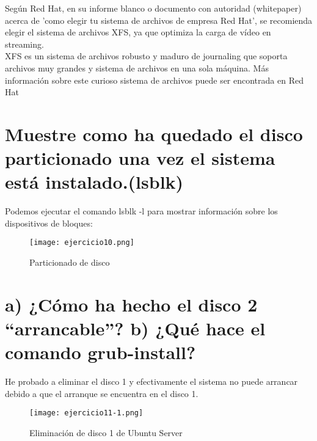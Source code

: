 	Según Red Hat, en su informe blanco o documento con autoridad\cite{treintaynueve} (whitepaper) acerca de 'como elegir tu sistema de archivos de empresa Red Hat', se recomienda elegir el sistema de archivos XFS, ya que optimiza la carga de vídeo en streaming.
	\\
	
	XFS es un sistema de archivos robusto y maduro de journaling que soporta archivos muy grandes y sistema de archivos en una sola máquina. Más información sobre este curioso sistema de archivos puede ser encontrada en Red Hat\cite{cuarenta}
	
	\section{Muestre como ha quedado el disco particionado una vez el sistema está instalado.(lsblk)}
	
	Podemos ejecutar el comando lsblk -l \cite{cuarentayuno} para mostrar información sobre los dispositivos de bloques:
	
	\begin{figure}[H] %
		\centering
		\texttt{[image: ejercicio10.png]}  %
		\label{figura8} 
		
		\caption{Particionado de disco} 
	\end{figure}
	
	\section{a) ¿Cómo ha hecho el disco 2 “arrancable”? b) ¿Qué hace el comando grub-install?}
	
	He probado a eliminar el disco 1 y efectivamente el sistema no puede arrancar debido a que el arranque se encuentra en el disco 1.
	
	\begin{figure}[H]
		\centering
		\texttt{[image: ejercicio11-1.png]} 
		\label{figura9} 		
		\caption{Eliminación de disco 1 de Ubuntu Server} 
	\end{figure}
	
